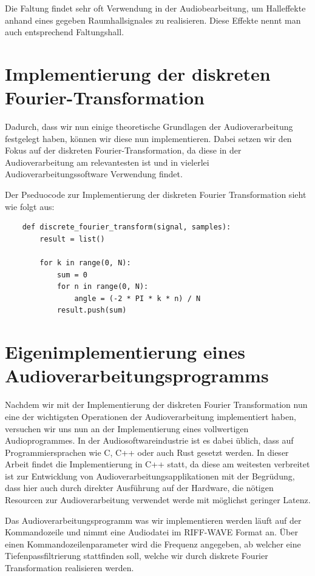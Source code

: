 \documentclass[paper=a4,fontsize=12pt,ngerman]{scrartcl}
\begin{document}
Die Faltung findet sehr oft Verwendung in der Audiobearbeitung, um Halleffekte anhand eines gegeben Raumhallsignales zu realisieren. Diese Effekte nennt man auch
entsprechend Faltungshall.

\section{Implementierung der diskreten Fourier-Transformation}

Dadurch, dass wir nun einige theoretische Grundlagen der Audioverarbeitung festgelegt haben, können wir diese nun implementieren. Dabei setzen wir den Fokus auf der diskreten Fourier-Transformation, da 
diese in der Audioverarbeitung am relevantesten ist und in vielerlei Audioverarbeitungssoftware Verwendung findet.

Der Pseduocode zur Implementierung der diskreten Fourier Transformation sieht wie folgt aus:

\begin{lstlisting}
    def discrete_fourier_transform(signal, samples):
        result = list()

        for k in range(0, N):
            sum = 0
            for n in range(0, N):
                angle = (-2 * PI * k * n) / N
            result.push(sum)
\end{lstlisting}

\section {Eigenimplementierung eines Audioverarbeitungsprogramms}

Nachdem wir mit der Implementierung der diskreten Fourier Transformation nun eine der wichtigsten Operationen der Audioverarbeitung implementiert haben, versuchen wir uns nun an der Implementierung eines vollwertigen Audioprogrammes.
In der Audiosoftwareindustrie ist es dabei üblich, dass auf Programmiersprachen wie C, C++ oder auch Rust gesetzt werden. In dieser Arbeit findet die Implementierung in C++ statt, da diese am weitesten verbreitet ist zur Entwicklung von
Audioverarbeitungsapplikationen mit der Begrüdung, dass hier auch durch direkter Ausführung auf der Hardware, die nötigen Resourcen zur Audioverarbeitung verwendet werde mit möglichst geringer Latenz.

Das Audioverarbeitungsprogramm was wir implementieren werden läuft auf der Kommandozeile und nimmt eine Audiodatei im RIFF-WAVE Format an.
Über einen Kommandozeilenparameter wird die Frequenz angegeben, ab welcher eine Tiefenpassfiltrierung stattfinden soll, welche wir durch diskrete Fourier Transformation realisieren werden.
\end{document}
